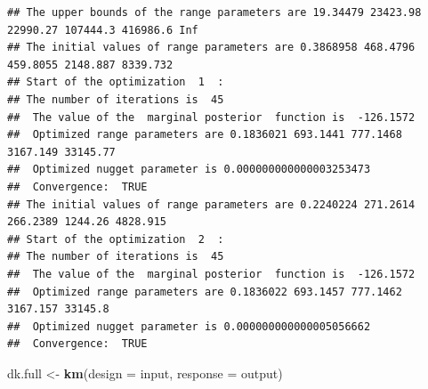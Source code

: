 \documentclass[
  10pt,
]{article}
\newenvironment{Shaded}{\begin{snugshade}}{\end{snugshade}}
\newcommand{\AttributeTok}[1]{\textcolor[rgb]{0.13,0.29,0.53}{#1}}
\newcommand{\FunctionTok}[1]{\textcolor[rgb]{0.13,0.29,0.53}{\textbf{#1}}}
\newcommand{\NormalTok}[1]{#1}
\newcommand{\OtherTok}[1]{\textcolor[rgb]{0.56,0.35,0.01}{#1}}
\begin{document}
\begin{verbatim}
## The upper bounds of the range parameters are 19.34479 23423.98 22990.27 107444.3 416986.6 Inf 
## The initial values of range parameters are 0.3868958 468.4796 459.8055 2148.887 8339.732 
## Start of the optimization  1  : 
## The number of iterations is  45 
##  The value of the  marginal posterior  function is  -126.1572 
##  Optimized range parameters are 0.1836021 693.1441 777.1468 3167.149 33145.77 
##  Optimized nugget parameter is 0.000000000000003253473 
##  Convergence:  TRUE 
## The initial values of range parameters are 0.2240224 271.2614 266.2389 1244.26 4828.915 
## Start of the optimization  2  : 
## The number of iterations is  45 
##  The value of the  marginal posterior  function is  -126.1572 
##  Optimized range parameters are 0.1836022 693.1457 777.1462 3167.157 33145.8 
##  Optimized nugget parameter is 0.000000000000005056662 
##  Convergence:  TRUE
\end{verbatim}

\begin{Shaded}
\begin{Highlighting}[]
\NormalTok{dk.full }\OtherTok{\textless{}{-}} \FunctionTok{km}\NormalTok{(}\AttributeTok{design =}\NormalTok{ input, }\AttributeTok{response =}\NormalTok{ output)}
\end{Highlighting}
\end{Shaded}
\end{document}
